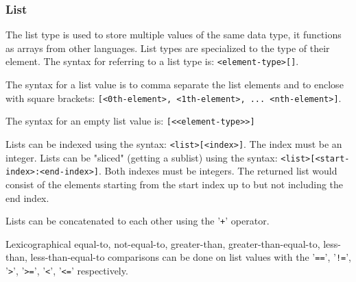 
\subsubsection{List}
{
	The list type is used to store multiple values of the same data type,
	it functions as arrays from other languages.
	List types are specialized to the type of their element.
	The syntax for referring to a list type is: \texttt{<element-type>[]}.
	
	The syntax for a list value is to comma separate the list elements
	and to enclose with square
	brackets: \texttt{[<0th-element>, <1th-element>, ... <nth-element>]}.
	
	The syntax for an empty list value is: \texttt{[<<element-type>>]}
	
	Lists can be indexed using the
	syntax: \texttt{<list>[<index>]}. The
	index must be an integer.
	Lists can be "sliced" (getting a sublist) using
	the syntax: \texttt{<list>[<start-index>:<end-index>]}. Both
	indexes must be integers. The returned list would consist of
	the elements starting from the start index up to but not including
	the end index.
	
	Lists can be concatenated to each other using the '\texttt{+}' operator.
	
	Lexicographical equal-to, not-equal-to, greater-than, greater-than-equal-to,
	less-than, less-than-equal-to comparisons can be done on list values with
	the '\texttt{==}', '\texttt{!=}',
	'\texttt{>}', '\texttt{>=}', '\texttt{<}', '\texttt{<=}' respectively.
}




















